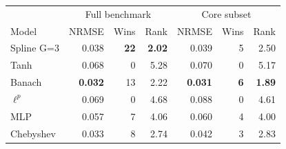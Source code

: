 \begin{tabular}{lrrrrrr}
\toprule
& \multicolumn{3}{c}{Full benchmark} & \multicolumn{3}{c}{Core subset} \\
Model & NRMSE & Wins & Rank & NRMSE & Wins & Rank \\
\midrule
Spline G=3 & 0.038 & \textbf{22} & \textbf{2.02} & 0.039 & 5 & 2.50 \\
Tanh & 0.068 & 0 & 5.28 & 0.070 & 0 & 5.17 \\
Banach & \textbf{0.032} & 13 & 2.22 & \textbf{0.031} & \textbf{6} & \textbf{1.89} \\
$\ell^p$ & 0.069 & 0 & 4.68 & 0.088 & 0 & 4.61 \\
MLP & 0.057 & 7 & 4.06 & 0.060 & 4 & 4.00 \\
Chebyshev & 0.033 & 8 & 2.74 & 0.042 & 3 & 2.83 \\
\bottomrule
\end{tabular}
